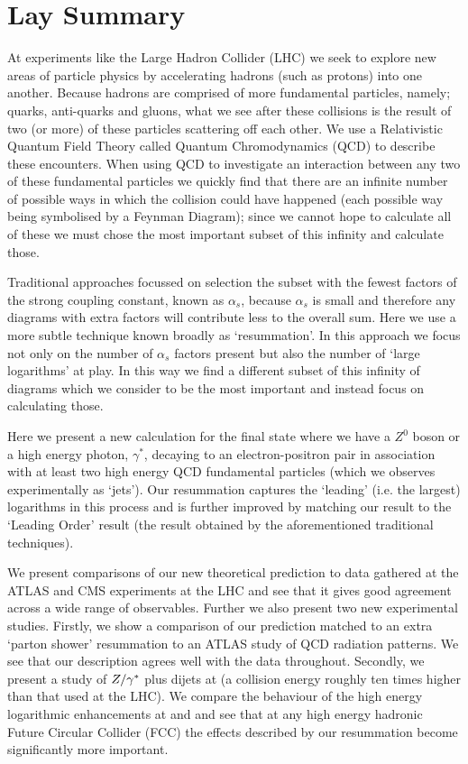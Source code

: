\chapter*{Lay Summary}
\noindent
	At experiments like the Large Hadron Collider (LHC) we seek to explore new areas of particle
	physics by accelerating hadrons (such as protons) into one another.  Because hadrons are
	comprised of more fundamental particles, namely; quarks, anti-quarks and gluons, what we
	see after these collisions is the result of two (or more) of these particles
	scattering off each other.  We use a Relativistic Quantum Field Theory called Quantum
	Chromodynamics (QCD) to describe these encounters.  When using QCD to investigate an
	interaction between any two of these fundamental particles we quickly find that there
	are an infinite number of possible ways in which the collision could have happened (each
	possible way being symbolised by a Feynman Diagram); since we cannot hope to calculate
	all of these we must chose the most important subset of this infinity and calculate those.

	Traditional approaches focussed on selection the subset with the fewest factors of the
	strong coupling constant, known as $\alpha_s$, because $\alpha_s$ is small and therefore
	any diagrams with extra factors will contribute less to the overall sum.  Here we use a
	more subtle technique known broadly as `resummation'.  In this approach we focus not only
	on the number of $\alpha_s$ factors present but also the number of `large logarithms' at
	play.  In this way we find a different subset of this infinity of diagrams which we consider
	to be the most important and instead focus on calculating those.

	Here we present a new calculation for the final state where we have a $Z^0$ boson or a
	high energy photon, $\gamma^*$, decaying to an electron-positron pair in
	association with at least two high energy QCD fundamental particles (which we observes
	experimentally as `jets').  Our resummation captures the `leading' (i.e. the largest)
	logarithms in this process and is further improved by matching our result to the `Leading
	Order' result (the result obtained by the aforementioned traditional techniques).

	We present comparisons of our new theoretical prediction to data gathered at the ATLAS
	and CMS experiments at the LHC and see that it gives good agreement across a wide range of
	observables.  Further we also present two new experimental studies.  Firstly, we show a
	comparison of our prediction matched to an extra `parton shower' resummation to an ATLAS
	study of QCD radiation patterns.  We see that our description agrees well with
	the data throughout.  Secondly, we present a study of $Z/\gamma^*$ plus dijets at \htev (a collision
	energy roughly ten times higher than that used at the LHC).  We compare the behaviour of the
	high energy logarithmic enhancements at \stev and \htev and see that at any high energy
	hadronic Future Circular Collider (FCC) the effects described by our resummation become
	significantly more important.
\vspace{10mm}
\normalsize

